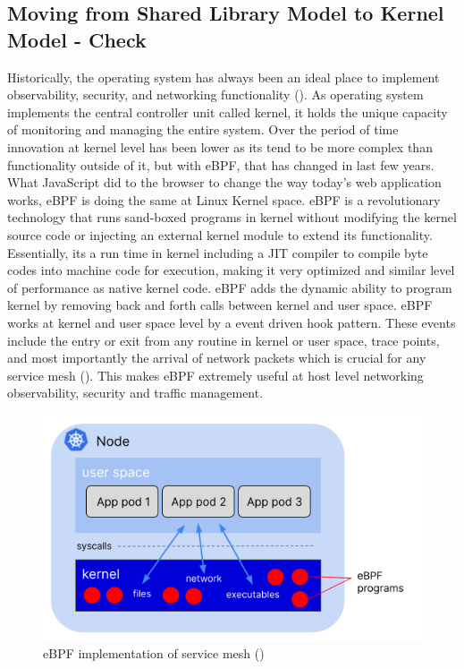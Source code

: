 \subsection{Moving from Shared Library Model to Kernel Model - Check}
\label{lr:ebpf}
Historically, the operating system has always been an ideal place to implement observability, security, and networking functionality (\cite{ebpfIODocs}). As operating system implements the central controller unit called kernel, it holds the unique capacity of monitoring and managing the entire system. Over the period of time innovation at kernel level has been lower as its tend to be more complex than functionality outside of it, but with eBPF, that has changed in last few years. What JavaScript did to the browser to change the way today's web application works, eBPF is doing the same at Linux Kernel space. eBPF is a revolutionary technology that runs sand-boxed programs in kernel without modifying the kernel source code or injecting an external kernel module to extend its functionality. Essentially, its a run time in kernel including a JIT compiler to compile byte codes into machine code for execution, making it very optimized and similar level of performance as  native kernel code. eBPF adds the dynamic ability to program kernel by removing back and forth calls between kernel and user space. eBPF works at kernel and user space level by a event driven hook pattern. These events include the entry or exit from any routine in kernel or user space, trace points, and most importantly the arrival of network packets which is crucial for any service mesh (\cite{thenewstackRice2021}). This makes eBPF extremely useful at host level networking observability, security and traffic management.

\begin{figure}[ht!]
    \centering
    \includegraphics[width=0.7\linewidth]{resources/ebpf-service-mesh.png}
    \caption{eBPF implementation of service mesh (\cite{thenewstackRice2021})}
    \label{lr:ebpfDesign}
 \end{figure}

